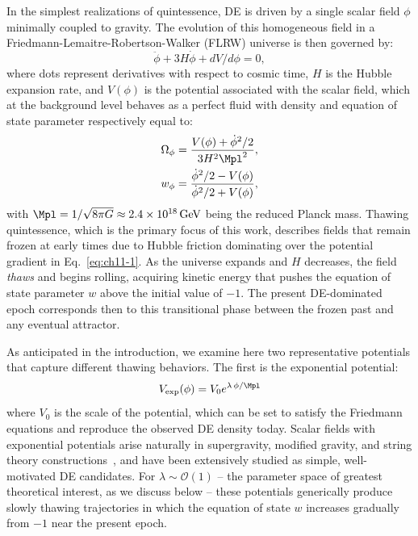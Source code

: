 \noindent In the simplest realizations of quintessence, DE is driven by a single scalar field $\phi$  minimally
coupled to gravity. The evolution of this homogeneous field in a Friedmann-Lemaitre-Robertson-Walker (FLRW) universe is then governed by:
\begin{equation}
    \ddot{\phi} + 3H\dot{\phi} +
dV/d\phi
= 0, \label{eq:ch11-1}
\end{equation}
where dots represent derivatives with respect to cosmic time, $H$ is the Hubble expansion rate, and $V(\phi)$ is the potential associated with the scalar field, which at the background level behaves as a perfect fluid with density and equation of state parameter respectively equal to:
\begin{align}
    &\Omega_\phi=\frac{V(\phi)+\dot{\phi}^2/2}{3 H^2 \Mpl^2},
    \\
    &w_\phi=\frac{\dot{\phi}^2/2-V(\phi)}{\dot{\phi}^2/2+V(\phi)},
\end{align}
with $\Mpl=1/\sqrt{8\pi G}\approx 2.4\times 10^{18}\,{\rm GeV}$ being the reduced Planck mass. Thawing quintessence, which is the primary focus of this work, describes fields that remain frozen at early times due to Hubble friction dominating over the potential gradient in Eq.~\eqref{eq:ch11-1}. As the universe expands and $H$ decreases, the field {\it thaws} and begins rolling, acquiring kinetic energy that pushes the equation of state parameter $w$ above the initial value of $-1$. The present DE-dominated epoch corresponds then to this transitional phase between the frozen past and any eventual attractor.

As anticipated in the introduction, we examine here two representative potentials that capture different thawing behaviors. The first is the exponential potential:
\begin{equation}
    V_{\rm exp}(\phi)
=V_0e^{\lambda\,\phi/\Mpl}\label{eq:ch11-exp}
\end{equation}
where $V_0$ is the scale of the potential, which can be set to satisfy the Friedmann equations and reproduce the observed DE density today. Scalar fields with exponential potentials arise naturally in supergravity, modified gravity, and string theory constructions~\cite{Wetterich:1994bg,Binetruy:1998rz,Bedroya:2019snp}, and have been extensively studied as simple, well-motivated DE candidates. For $\lambda \sim \mathcal{O}(1)$ -- the parameter space of greatest theoretical interest, as we discuss below -- these potentials generically produce slowly thawing trajectories in which the equation of state $w$ increases gradually from $-1$ near the present epoch.

